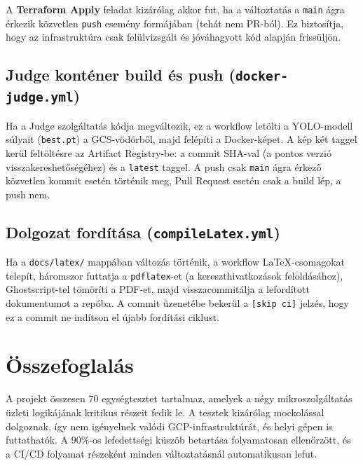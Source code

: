 \documentclass[12pt,a4paper]{article}
\begin{document}
A \textbf{Terraform Apply} feladat kizárólag akkor fut, ha a változtatás a
\texttt{main} ágra érkezik közvetlen \texttt{push} esemény formájában (tehát
nem PR-ból). Ez biztosítja, hogy az infrastruktúra csak felülvizsgált és
jóváhagyott kód alapján frissüljön.

\subsection{Judge konténer build és push (\texttt{docker-judge.yml})}

Ha a Judge szolgáltatás kódja megváltozik, ez a workflow letölti a YOLO-modell
súlyait (\texttt{best.pt}) a GCS-vödörből, majd felépíti a Docker-képet.
A kép két taggel kerül feltöltésre az Artifact Registry-be: a commit SHA-val
(a pontos verzió visszakereshetőségéhez) és a \texttt{latest} taggel.
A push csak \texttt{main} ágra érkező közvetlen kommit esetén történik meg, Pull Request esetén csak a build lép, a push nem.

\subsection{Dolgozat fordítása (\texttt{compileLatex.yml})}

Ha a \texttt{docs/latex/} mappában változás történik, a workflow LaTeX-csomagokat
telepít, háromszor futtatja a \texttt{pdflatex}-et (a kereszthivatkozások feloldásához),
Ghostscript-tel tömöríti a PDF-et, majd visszacommitálja a lefordított dokumentumot
a repóba. A commit üzenetébe bekerül a \texttt{[skip ci]} jelzés, hogy ez a
commit ne indítson el újabb fordítási ciklust.

\section{Összefoglalás}

A projekt összesen 70 egységtesztet tartalmaz, amelyek a négy mikroszolgáltatás
üzleti logikájának kritikus részeit fedik le. A tesztek kizárólag mockolással
dolgoznak, így nem igényelnek valódi GCP-infrastruktúrát, és helyi gépen is
futtathatók. A 90\%-os lefedettségi küszöb betartása folyamatosan ellenőrzött,
és a CI/CD folyamat részeként minden változtatásnál automatikusan lefut.
\end{document}
